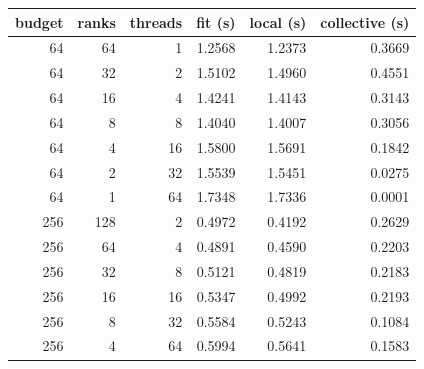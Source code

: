 \begin{tabular}{rrrrrr}
\toprule
budget & ranks & threads & fit (s) & local (s) & collective (s)\\
\midrule
64 & 64 & 1 & 1.2568 & 1.2373 & 0.3669\\
64 & 32 & 2 & 1.5102 & 1.4960 & 0.4551\\
64 & 16 & 4 & 1.4241 & 1.4143 & 0.3143\\
64 & 8 & 8 & 1.4040 & 1.4007 & 0.3056\\
64 & 4 & 16 & 1.5800 & 1.5691 & 0.1842\\
64 & 2 & 32 & 1.5539 & 1.5451 & 0.0275\\
64 & 1 & 64 & 1.7348 & 1.7336 & 0.0001\\
256 & 128 & 2 & 0.4972 & 0.4192 & 0.2629\\
256 & 64 & 4 & 0.4891 & 0.4590 & 0.2203\\
256 & 32 & 8 & 0.5121 & 0.4819 & 0.2183\\
256 & 16 & 16 & 0.5347 & 0.4992 & 0.2193\\
256 & 8 & 32 & 0.5584 & 0.5243 & 0.1084\\
256 & 4 & 64 & 0.5994 & 0.5641 & 0.1583\\
\bottomrule
\end{tabular}
